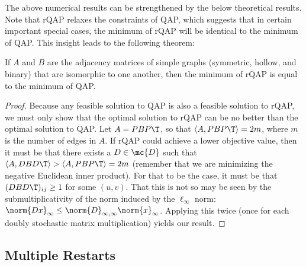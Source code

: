 \documentclass[10pt,journal,cspaper,compsoc]{IEEEtran}
\begin{document}
The above numerical results can be strengthened by the below theoretical results.  
Note that rQAP relaxes the constraints of QAP, which suggests that in certain important special cases, the minimum of rQAP will be identical to the minimum of QAP.  This insight leads to the following theorem:
\begin{lem}
	If $A$ and $B$ are the adjacency matrices of simple graphs (symmetric, hollow, and binary) that are isomorphic to one another, then the minimum of rQAP is equal to the minimum of QAP.
\end{lem}
\begin{proof}
Because any feasible solution to QAP is also a feasible solution to rQAP, we must only show that the optimal solution to rQAP can be no better than the optimal solution to QAP.  Let $A=PBP\T$, so that $\langle A, PBP\T\rangle=2m$, where $m$ is the number of edges in $A$.  If rQAP could achieve a lower objective value, then it must be that there exists a $D \in \mc{D}$ such that $\langle A, DBD\T\rangle > \langle A, PBP\T\rangle = 2m$ (remember that we are minimizing the negative Euclidean inner product). For that to be the case, it must be that $(DBD\T)_{ij} \geq 1$ for some $(u,v)$.  That this is not so may be seen by the submultiplicativity of the norm induced by the $\ell_{\infty}$ norm:
$\norm{Dx}_\infty \leq \norm{D}_{\infty,\infty} \norm{x}_\infty$.  Applying this twice (once for each doubly stochastic matrix multiplication) yields our result.
\end{proof}







\subsection{Multiple Restarts} %
\label{sub:multiple_restarts}
\end{document}
